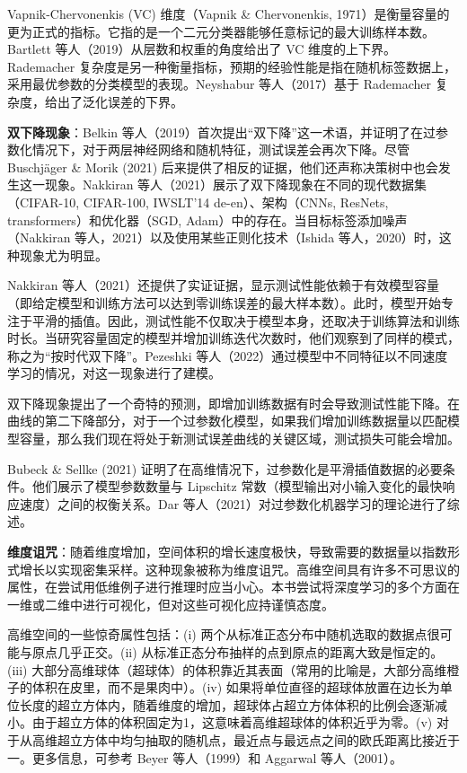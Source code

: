 Vapnik-Chervonenkis (VC) 维度（Vapnik \& Chervonenkis, 1971）是衡量容量的更为正式的指标。它指的是一个二元分类器能够任意标记的最大训练样本数。Bartlett 等人（2019）从层数和权重的角度给出了 VC 维度的上下界。Rademacher 复杂度是另一种衡量指标，预期的经验性能是指在随机标签数据上，采用最优参数的分类模型的表现。Neyshabur 等人（2017）基于 Rademacher 复杂度，给出了泛化误差的下界。

\textbf{双下降现象}：Belkin 等人（2019）首次提出“双下降”这一术语，并证明了在过参数化情况下，对于两层神经网络和随机特征，测试误差会再次下降。尽管 Buschjäger \& Morik (2021) 后来提供了相反的证据，他们还声称决策树中也会发生这一现象。Nakkiran 等人（2021）展示了双下降现象在不同的现代数据集（CIFAR-10, CIFAR-100, IWSLT’14 de-en）、架构（CNNs, ResNets, transformers）和优化器（SGD, Adam）中的存在。当目标标签添加噪声（Nakkiran 等人，2021）以及使用某些正则化技术（Ishida 等人，2020）时，这种现象尤为明显。

Nakkiran 等人（2021）还提供了实证证据，显示测试性能依赖于有效模型容量（即给定模型和训练方法可以达到零训练误差的最大样本数）。此时，模型开始专注于平滑的插值。因此，测试性能不仅取决于模型本身，还取决于训练算法和训练时长。当研究容量固定的模型并增加训练迭代次数时，他们观察到了同样的模式，称之为“按时代双下降”。Pezeshki 等人（2022）通过模型中不同特征以不同速度学习的情况，对这一现象进行了建模。

双下降现象提出了一个奇特的预测，即增加训练数据有时会导致测试性能下降。在曲线的第二下降部分，对于一个过参数化模型，如果我们增加训练数据量以匹配模型容量，那么我们现在将处于新测试误差曲线的关键区域，测试损失可能会增加。

Bubeck \& Sellke (2021) 证明了在高维情况下，过参数化是平滑插值数据的必要条件。他们展示了模型参数数量与 Lipschitz 常数（模型输出对小输入变化的最快响应速度）之间的权衡关系。Dar 等人（2021）对过参数化机器学习的理论进行了综述。

\textbf{维度诅咒}：随着维度增加，空间体积的增长速度极快，导致需要的数据量以指数形式增长以实现密集采样。这种现象被称为维度诅咒。高维空间具有许多不可思议的属性，在尝试用低维例子进行推理时应当小心。本书尝试将深度学习的多个方面在一维或二维中进行可视化，但对这些可视化应持谨慎态度。

高维空间的一些惊奇属性包括：(i) 两个从标准正态分布中随机选取的数据点很可能与原点几乎正交。(ii) 从标准正态分布抽样的点到原点的距离大致是恒定的。(iii) 大部分高维球体（超球体）的体积靠近其表面（常用的比喻是，大部分高维橙子的体积在皮里，而不是果肉中）。(iv) 如果将单位直径的超球体放置在边长为单位长度的超立方体内，随着维度的增加，超球体占超立方体体积的比例会逐渐减小。由于超立方体的体积固定为1，这意味着高维超球体的体积近乎为零。(v) 对于从高维超立方体中均匀抽取的随机点，最近点与最远点之间的欧氏距离比接近于一。更多信息，可参考 Beyer 等人（1999）和 Aggarwal 等人（2001）。


